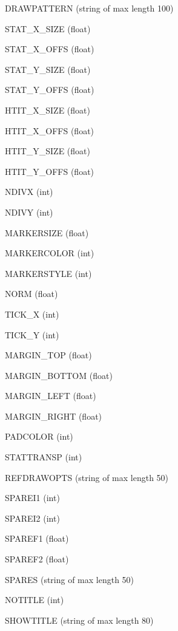 \item{DRAWPATTERN}  (string of max length 100)
\item{STAT\_X\_SIZE}  (float)
\item{STAT\_X\_OFFS}  (float)
\item{STAT\_Y\_SIZE}  (float)
\item{STAT\_Y\_OFFS}  (float)
\item{HTIT\_X\_SIZE}  (float)
\item{HTIT\_X\_OFFS}  (float)
\item{HTIT\_Y\_SIZE}  (float)
\item{HTIT\_Y\_OFFS}  (float)
\item{NDIVX}  (int)
\item{NDIVY}  (int)
\item{MARKERSIZE}  (float)
\item{MARKERCOLOR}  (int)
\item{MARKERSTYLE}  (int)
\item{NORM}  (float)
\item{TICK\_X}  (int)
\item{TICK\_Y}  (int)
\item{MARGIN\_TOP}  (float)
\item{MARGIN\_BOTTOM}  (float)
\item{MARGIN\_LEFT}  (float)
\item{MARGIN\_RIGHT}  (float)
\item{PADCOLOR}  (int)
\item{STATTRANSP}  (int)
\item{REFDRAWOPTS}  (string of max length 50)
\item{SPAREI1}  (int)
\item{SPAREI2}  (int)
\item{SPAREF1}  (float)
\item{SPAREF2}  (float)
\item{SPARES}  (string of max length 50)
\item{NOTITLE}  (int)
\item{SHOWTITLE}  (string of max length 80)
